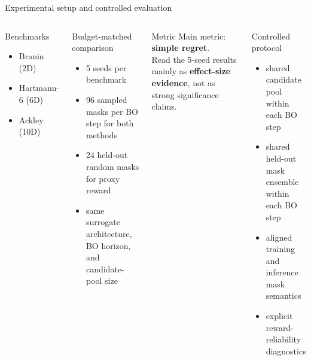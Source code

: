 \documentclass[aspectratio=169]{beamer}
\begin{document}
\begin{frame}{Experimental setup and controlled evaluation}
\vspace{-0.55em}
\begin{columns}[T,onlytextwidth]
\begin{minipage}[t][0.82\textheight]{\linewidth}\vspace{0pt}
  \begin{cardA}{Benchmarks}
  \begin{itemize}
    \item Branin (2D)
    \item Hartmann-6 (6D)
    \item Ackley (10D)
  \end{itemize}
  \end{cardA}

  \vfill

  \begin{card}{Budget-matched comparison}
  \begin{itemize}
    \item 5 seeds per benchmark
    \item 96 sampled masks per BO step for both methods
    \item 24 held-out random masks for proxy reward
    \item same surrogate architecture, BO horizon, and candidate-pool size
  \end{itemize}
  \end{card}

  \vfill

  \begin{card}{Metric}
  Main metric: \textbf{simple regret}.\\[0.2em]
  Read the 5-seed results mainly as \textbf{effect-size evidence}, not as strong significance claims.
  \end{card}
\end{minipage}

\begin{minipage}[t][0.82\textheight]{\linewidth}\vspace{0pt}
  \begin{cardW}{Controlled protocol}
  \begin{itemize}
    \item shared candidate pool within each BO step
    \item shared held-out mask ensemble within each BO step
    \item aligned training and inference mask semantics
    \item explicit reward-reliability diagnostics
  \end{itemize}
  \end{cardW}


\end{minipage}
\end{columns}
\end{frame}
\end{document}
